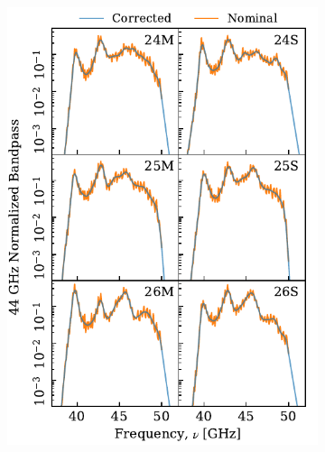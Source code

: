 \documentclass[twocolumn]{aa}
\newcommand{\?}[1]{\textcolor{red}{{\bf [#1]}}}
\begin{document}
\begin{figure}[p]
\begin{subfigure}{0.45\linewidth}
    \includegraphics[width=\linewidth]{figs/bpcorrected_44GHz.pdf}
  \end{subfigure}
  \begin{subfigure}{0.45\linewidth}

\end{subfigure}
\end{figure}
\end{document}
